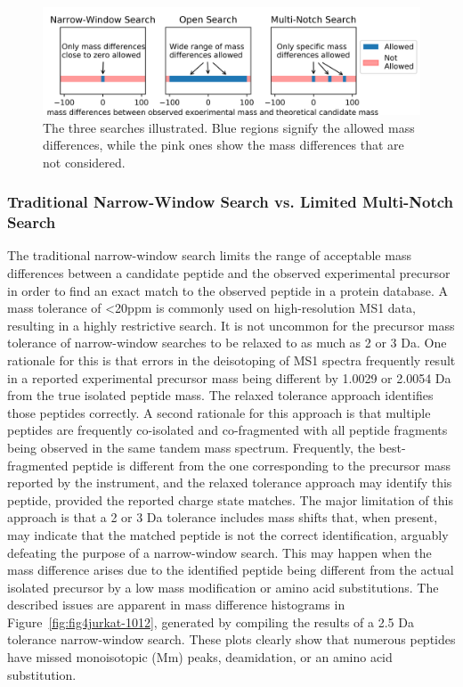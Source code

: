 \documentclass[journal=jprobs,manuscript=article]{achemso}
\begin{document}
\begin{figure}[H]
\includegraphics{fig3-searchTypes.png}
\caption{The three searches illustrated. Blue regions signify the allowed mass differences, while the pink ones show the mass differences that are not considered.}
\label{fig:fig3-searchTypes}
\end{figure}

\subsubsection{Traditional Narrow-Window Search vs. Limited Multi-Notch Search}

The traditional narrow-window search limits the range of acceptable mass differences between a candidate peptide and the observed experimental precursor in order to find an exact match to the observed peptide in a protein database.
A mass tolerance of <20ppm is commonly used on high-resolution MS1 data, resulting in a highly restrictive search.
It is not uncommon for the precursor mass tolerance of narrow-window searches to be relaxed to as much as 2 or 3 Da.
One rationale for this is that errors in the deisotoping of MS1 spectra frequently result in a reported experimental precursor mass being different by 1.0029 or 2.0054 Da from the true isolated peptide mass.
The relaxed tolerance approach identifies those peptides correctly.
A second rationale for this approach is that multiple peptides are frequently co-isolated and co-fragmented with all peptide fragments being observed in the same tandem mass spectrum.
Frequently, the best-fragmented peptide is different from the one corresponding to the precursor mass reported by the instrument, and the relaxed tolerance approach may identify this peptide, provided the reported charge state matches.
The major limitation of this approach is that a 2 or 3 Da tolerance includes mass shifts that, when present, may indicate that the matched peptide is not the correct identification, arguably defeating the purpose of a narrow-window search.
This may happen when the mass difference arises due to the identified peptide being different from the actual isolated precursor by a low mass modification or amino acid substitutions.
The described issues are apparent in mass difference histograms in Figure~\ref{fig:fig4jurkat-1012}, generated by compiling the results of a 2.5 Da tolerance narrow-window search.
These plots clearly show that numerous peptides have missed monoisotopic (Mm) peaks, deamidation, or an amino acid substitution.
\end{document}
